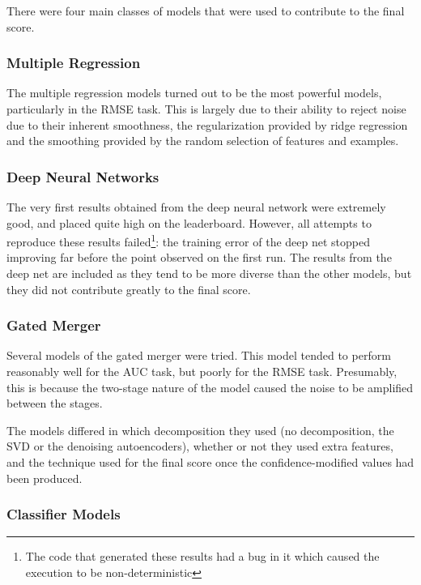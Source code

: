 \documentclass{article}
\begin{document}
There were four main classes of models that were used to contribute to the final score.

\subsubsection{Multiple Regression}

The multiple regression models turned out to be the most powerful models, particularly in the RMSE task.  This is largely due to their ability to reject noise due to their inherent smoothness, the regularization provided by ridge regression and the smoothing provided by the random selection of features and examples.

\subsubsection{Deep Neural Networks}

The very first results obtained from the deep neural network were extremely good, and placed quite high on the leaderboard.  However, all attempts to reproduce these results failed\footnote{The code that generated these results had a bug in it which caused the execution to be non-deterministic}: the training error of the deep net stopped improving far before the point observed on the first run.  The results from the deep net are included as they tend to be more diverse than the other models, but they did not contribute greatly to the final score.

\subsubsection{Gated Merger}

Several models of the gated merger were tried.  This model tended to perform reasonably well for the AUC task, but poorly for the RMSE task.  Presumably, this is because the two-stage nature of the model caused the noise to be amplified between the stages.

The models differed in which decomposition they used (no decomposition, the SVD or the denoising autoencoders), whether or not they used extra features, and the technique used for the final score once the confidence-modified values had been produced.

\subsubsection{Classifier Models}
\end{document}
